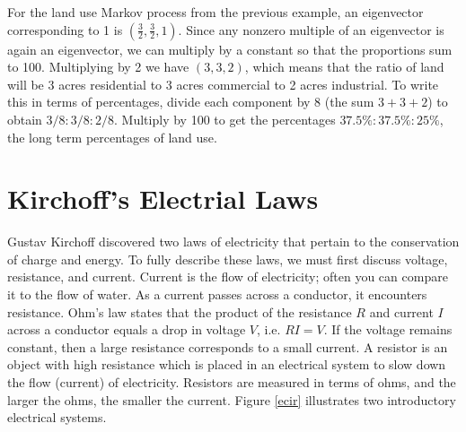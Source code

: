 \begin{example}
For the land use Markov process from the previous example, an eigenvector corresponding to 1 is $\left(\frac{3}{2},\frac32,1\right)$. 
Since any nonzero multiple of an eigenvector is again an eigenvector, we can multiply by a constant so that the proportions sum to 100. 
Multiplying by 2 we have $(3,3,2)$, which means that the ratio of land will be 3 acres residential to 3 acres commercial to 2 acres industrial. 
To write this in terms of percentages, divide each component by 8 (the sum $3+3+2$) to obtain $3/8:3/8:2/8$. Multiply by 100 to get the percentages $37.5\%:37.5\%:25\%$, the long term percentages of land use.
\end{example}


















\section{Kirchoff's Electrial Laws}
Gustav Kirchoff discovered two laws of electricity that pertain to the conservation of charge and energy. 
To fully describe these laws, we must first discuss voltage, resistance, and current.  
Current is the flow of electricity; often you can compare it to the flow of water.  As a current passes across a conductor, it encounters resistance. 
Ohm's law states that the product of the resistance $R$ and current $I$ across a conductor equals a drop in voltage $V$, i.e. $RI=V$. 
If the voltage remains constant, then a large resistance corresponds to a small current. 
A resistor is an object with high resistance which is placed in an electrical system to slow down the flow (current) of electricity. 
Resistors are measured in terms of ohms, and the larger the ohms, the smaller the current.  Figure \ref{ecir} illustrates two introductory electrical systems. 



